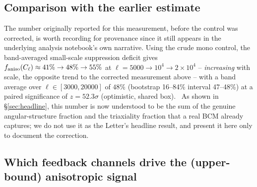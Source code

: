 \documentclass[11pt]{article}
\newcommand{\faniso}{f_{\rm aniso}}
\begin{document}
\subsection{Comparison with the earlier estimate}\label{sec:old}

The number originally reported for this measurement, before the control
was corrected, is worth recording for provenance since it still appears
in the underlying analysis notebook's own narrative. Using the crude mono
control, the band-averaged small-scale suppression deficit gives
$\faniso(C_\ell)\approx41\%\to48\%\to55\%$ at $\ell=5000\to10^4\to
2\times10^4$ -- \emph{increasing} with scale, the opposite trend to the
corrected measurement above -- with a band average over
$\ell\in[3000,20000]$ of $48\%$ (bootstrap 16--84\% interval
47--48\%) at a paired significance of $z=52.3\sigma$ (optimistic, shared
box).\ %
As shown in \S\ref{sec:headline}, this number is now understood to be the
sum of the genuine angular-structure fraction and the triaxiality
fraction that a real BCM already captures; we do not use it as the
Letter's headline result, and present it here only to document the
correction.

\subsection{Which feedback channels drive the (upper-bound) anisotropic signal}\label{sec:feedback}
\end{document}
